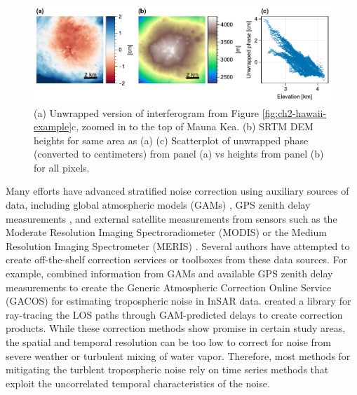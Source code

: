\begin{figure}
	\centering
	\includegraphics[width=1.0\textwidth]{figures/chapter2-sar/hawaii-strat-zoom.pdf}
	\caption[Stratified tropospheric noise over Hawaii]{
		(a) Unwrapped version of interferogram from Figure \ref{fig:ch2-hawaii-example}c, zoomed in to the top of Mauna Kea.
		(b) SRTM DEM heights for same area as (a)
		(c) Scatterplot of unwrapped phase (converted to centimeters) from panel (a) vs heights from panel (b) for all pixels.
	}
	\label{fig:ch2-hawaii-strat}
\end{figure}


Many efforts have advanced stratified noise correction using auxiliary sources of data, including global atmospheric models (GAMs) \citep{Doin2009CorrectionsStratifiedTropospheric, Jolivet2011SystematicInsarTropospheric, Jolivet2014ImprovingInsarGeodesy, Cao2021AdvancedInsarTropospheric}, GPS zenith delay measurements \citep{Onn2006ModelingWaterVapor, Yu2017GenerationRealTime}, and external satellite measurements from sensors such as the Moderate Resolution Imaging Spectroradiometer (MODIS) \citep{Li2005InterferometricSyntheticAperture, Barnhart2013CharacterizingEstimatingNoise} or the Medium Resolution Imaging Spectrometer (MERIS)  \citep{Ding2008AtmosphericEffectsInsar}.
Several authors have attempted to create off-the-shelf correction services or toolboxes from these data sources. For example,	
\cite{Yu2018GenericAtmosphericCorrection} combined information from GAMs and available GPS zenith delay measurements to create the Generic Atmospheric Correction Online Service (GACOS) for estimating tropospheric noise in InSAR data. \cite{Maurer2021RaiderRaytracingAtmospheric} created a library for ray-tracing the LOS paths through GAM-predicted delays to create correction products.
While these correction methods show promise in certain study areas, the spatial and temporal resolution can be too low to correct for noise from severe weather or turbulent mixing of water vapor. Therefore, most methods for mitigating the turblent tropospheric noise rely on time series methods that exploit the uncorrelated temporal characteristics of the noise.


